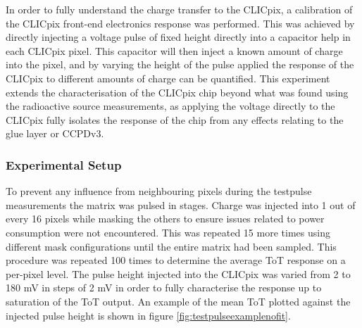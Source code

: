 In order to fully understand the charge transfer to the CLICpix, a calibration of the CLICpix front-end electronics response was performed.  This was achieved by directly injecting a voltage pulse of fixed height directly into a capacitor help in each CLICpix pixel.  This capacitor will then inject a known amount of charge into the pixel, and by varying the height of the pulse applied the response of the CLICpix to different amounts of charge can be quantified.  This experiment extends the characterisation of the CLICpix chip beyond what was found using the radioactive source measurements, as applying the voltage directly to the CLICpix fully isolates the response of the chip from any effects relating to the glue layer or CCPDv3.  


\subsubsection{Experimental Setup}

To prevent any influence from neighbouring pixels during the testpulse measurements the matrix was pulsed in stages.  Charge was injected into 1 out of every 16 pixels while masking the others to ensure issues related to power consumption were not encountered.  This was repeated 15 more times using different mask configurations until the entire matrix had been sampled.  This procedure was repeated 100 times to determine the average ToT response on a per-pixel level.  The pulse height injected into the CLICpix was varied from 2 to 180 mV in steps of 2 mV in order to fully characterise the response up to saturation of the ToT output.  An example of the mean ToT plotted against the injected pulse height is shown in figure \ref{fig:testpulseexamplenofit}.  

